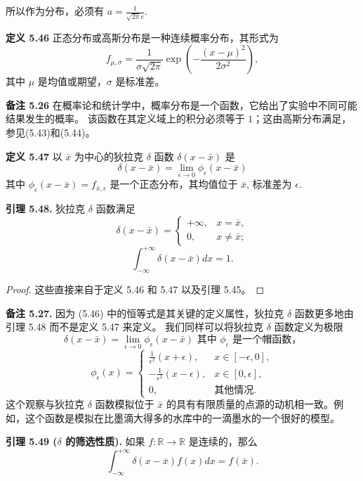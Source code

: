 \documentclass[a4paper]{ctexart}
\begin{document}
{所以作为分布，必须有 $a = \frac{1}{\sqrt{2 \pi}c}$.

\noindent \textbf{定义 5.46 } 正态分布或高斯分布是一种连续概率分布，其形式为
\[ 
  f_{\mu,\sigma} = \frac{1}{\sigma\sqrt{2\pi}} \exp\left(-\frac{(x-\mu)^2}{2\sigma^2}\right), \tag{5.44} 
\]
其中 $\mu$ 是均值或期望，$\sigma$ 是标准差。

\noindent \textbf{备注 5.26 } 在概率论和统计学中，概率分布是一个函数，它给出了实验中不同可能结果发生的概率。
该函数在其定义域上的积分必须等于 $1$；这由高斯分布满足，参见(5.43)和(5.44)。

\noindent \textbf{定义 5.47 } 以 $\bar{x}$ 为中心的狄拉克 $\delta$ 函数 $\delta(x-\bar{x})$ 是
\[ 
  \delta(x-\bar{x}) = \lim_{\epsilon \to 0} \phi_{\epsilon}(x-\bar{x}) \tag{5.45}
\]
其中 $\phi_{\epsilon}(x-\bar{x}) = f_{\bar{x},\epsilon}$ 是一个正态分布，其均值位于 $\bar{x}$, 
标准差为 $\epsilon$.

\noindent \textbf{引理 5.48.} 狄拉克 $\delta$ 函数满足
\[ 
  \delta(x-\bar{x}) = \begin{cases} +\infty, & x=\bar{x}, \\ 0, & x\neq\bar{x}; \end{cases} \tag{5.46a} 
\]
\[ 
  \int_{-\infty}^{+\infty} \delta(x-\bar{x}) dx = 1. \tag{5.46b}
\]

\begin{proof}
  这些直接来自于定义 5.46 和 5.47 以及引理 5.45。
\end{proof}

\noindent \textbf{备注 5.27.} 因为 (5.46) 中的恒等式是其关键的定义属性，狄拉克 $\delta$ 函数更多地由引理 5.48 而不是定义 5.47 来定义。
我们同样可以将狄拉克 $\delta$ 函数定义为极限
\[ 
  \delta(x-\bar{x}) = \lim_{\epsilon \to 0} \phi_{\epsilon}(x-\bar{x}) \text{ 其中 } \phi_{\epsilon} \text{ 是一个帽函数，} 
\]
\[ 
  \phi_{\epsilon}(x) = \begin{cases} \frac{1}{\epsilon^2}(x+\epsilon), & x \in [-\epsilon,0], \\ -\frac{1}{\epsilon^2}(x-\epsilon), & x \in [0,\epsilon], \\ 0, & \text{其他情况.} \end{cases} 
\]
这个观察与狄拉克 $\delta$ 函数模拟位于 $\bar{x}$ 的具有有限质量的点源的动机相一致。例如，这个函数是模拟在比墨滴大得多的水库中的一滴墨水的一个很好的模型。

\noindent \textbf{引理 5.49 ($\delta$ 的筛选性质).} 如果 $f: \mathbb{R} \to \mathbb{R}$ 是连续的，那么
\[ 
  \int_{-\infty}^{+\infty} \delta(x-\bar{x}) f(x) dx = f(\bar{x}). \tag{5.47} 
\]

}
\end{document}
